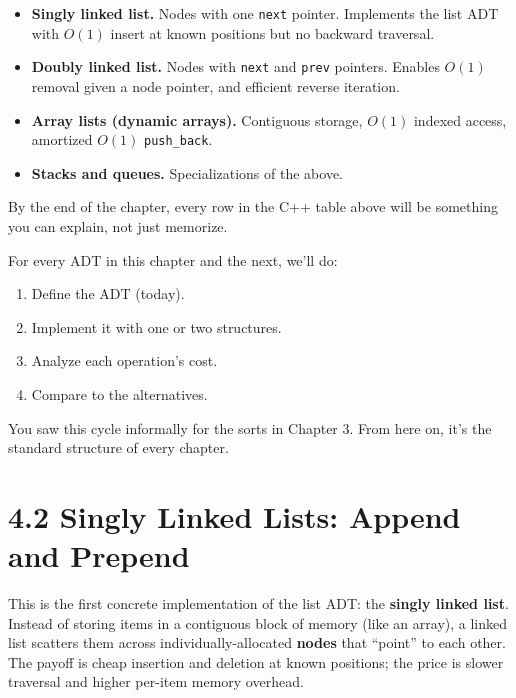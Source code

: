 \documentclass[11pt]{article}
\begin{document}
\begin{ideabox}
\begin{itemize}[leftmargin=*]
  \item \textbf{Singly linked list.} Nodes with one \texttt{next}
        pointer. Implements the list ADT with $O(1)$ insert at
        known positions but no backward traversal.
  \item \textbf{Doubly linked list.} Nodes with \texttt{next} and
        \texttt{prev} pointers. Enables $O(1)$ removal given a
        node pointer, and efficient reverse iteration.
  \item \textbf{Array lists (dynamic arrays).} Contiguous storage,
        $O(1)$ indexed access, amortized $O(1)$ \texttt{push\_back}.
  \item \textbf{Stacks and queues.} Specializations of the above.
\end{itemize}
By the end of the chapter, every row in the C++ table above will be
something you can explain, not just memorize.
\end{ideabox}

\begin{notebox}
For every ADT in this chapter and the next, we'll do:
\begin{enumerate}[leftmargin=*]
  \item Define the ADT (today).
  \item Implement it with one or two structures.
  \item Analyze each operation's cost.
  \item Compare to the alternatives.
\end{enumerate}
You saw this cycle informally for the sorts in Chapter 3. From here
on, it's the standard structure of every chapter.
\end{notebox}

\section{4.2 Singly Linked Lists: Append and Prepend}

This is the first concrete implementation of the list ADT: the
\textbf{singly linked list}. Instead of storing items in a contiguous
block of memory (like an array), a linked list scatters them across
individually-allocated \textbf{nodes} that ``point'' to each other.
The payoff is cheap insertion and deletion at known positions; the
price is slower traversal and higher per-item memory overhead.
\end{document}
